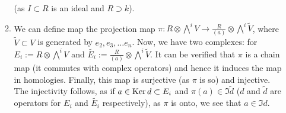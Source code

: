 \documentclass[8pt,fleqn]{article} %
\newcommand{\Ker}{\mbox{\normalfont Ker\,}}
\begin{document}
\begin{enumerate}[label=\bfseries Problem \arabic*.]
\begin{enumerate}[label=(\arabic*).]
	(as $I\subset R$ is an ideal and $R\supset k$).
\item We can define map the projection map $\pi:R\otimes \bigwedge^i V\to \frac{R}{(a)}\otimes\bigwedge^i\widetilde{V}$, where
	$\widetilde{V}\subset V$ is generated by $e_2,e_3,\hdots e_n$. Now, we have two complexes: for $E_i:=R\otimes\bigwedge^iV$ and
	$\widetilde{E_i}:=\frac{R}{(a)}\otimes\bigwedge^i\widetilde{V}$. It can be verified that $\pi$ is a chain map (it commutes
	with complex operators) and hence it induces the map in homologies. Finally, this map is surjective (as $\pi$ is so) and injective.
	The injectivity follows, as if $a\in \Ker d\subset E_i$ and $\pi(a)\in\Im\widetilde{d}$ ($d$ and $\widetilde{d}$ are operators
	for $E_i$ and $\widetilde{E_i}$ respectively), as $\pi$ is onto, we see that $a\in\Im d$.
		\end{enumerate}
\end{enumerate}
\end{document}
